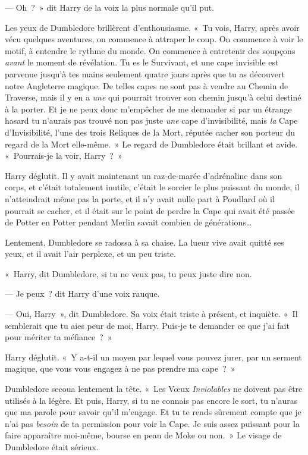 --- Oh~?~» dit Harry de la voix la plus normale qu'il put.

Les yeux de Dumbledore brillèrent d'enthousiasme. «~Tu vois, Harry, après avoir vécu quelques aventures, on commence à attraper le coup. On commence à voir le motif, à entendre le rythme du monde. On commence à entretenir des soupçons \emph{avant} le moment de révélation. Tu es le Survivant, et une cape invisible est parvenue jusqu'à tes mains seulement quatre jours après que tu as découvert notre Angleterre magique. De telles capes ne sont pas à vendre au Chemin de Traverse, mais il y en a \emph{une} qui pourrait trouver son chemin jusqu'à celui destiné à la porter. Et je ne peux donc m'empêcher de me demander si par un étrange hasard tu n'aurais pas trouvé non pas juste \emph{une} cape d'invisibilité, mais \emph{la} Cape d'Invisibilité, l'une des trois Reliques de la Mort, réputée cacher son porteur du regard de la Mort elle-même.~» Le regard de Dumbledore était brillant et avide. «~Pourrais-je la voir, Harry~?~»

Harry déglutit. Il y avait maintenant un raz-de-marée d'adrénaline dans son corps, et c'était totalement inutile, c'était le sorcier le plus puissant du monde, il n'atteindrait même pas la porte, et il n'y avait nulle part à Poudlard où il pourrait se cacher, et il était sur le point de perdre la Cape qui avait été passée de Potter en Potter pendant Merlin savait combien de générations…

Lentement, Dumbledore se radossa à sa chaise. La lueur vive avait quitté ses yeux, et il avait l'air perplexe, et un peu triste.

«~Harry, dit Dumbledore, si tu ne veux pas, tu peux juste dire non.

--- Je peux~? dit Harry d'une voix rauque.

--- Oui, Harry~», dit Dumbledore. Sa voix était triste à présent, et inquiète. «~Il semblerait que tu aies peur de moi, Harry. Puis-je te demander ce que j'ai fait pour mériter ta méfiance~?~»

Harry déglutit. «~Y a-t-il un moyen par lequel vous pouvez jurer, par un serment magique, que vous vous engagez à ne pas prendre ma cape~?~»

Dumbledore secoua lentement la tête. «~Les Vœux \emph{Inviolables} ne doivent pas être utilisés à la légère. Et puis, Harry, si tu ne connais pas encore le sort, tu n'auras que ma parole pour savoir qu'il m'engage. Et tu te rends sûrement compte que je n'ai pas \emph{besoin} de ta permission pour voir la Cape. Je suis assez puissant pour la faire apparaître moi-même, bourse en peau de Moke ou non.~» Le visage de Dumbledore était sérieux.

